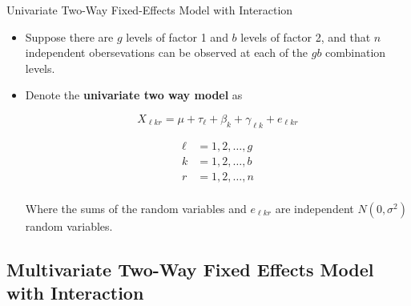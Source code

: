 \documentclass[8pt]{beamer}
\begin{document}
    \begin{frame}{Univariate Two-Way Fixed-Effects Model with Interaction} 
    
        \begin{itemize}
            \item Suppose there are $g$ levels of factor 1 and $b$ levels of factor 2, and that $n$ independent obersevations can be observed at each of the $gb$ combination levels.
            
            \item Denote the \textbf{univariate two way model} as
             
            \begin{equation}
                X_{\ell k r} = \mu + \tau_{\ell} + \beta_{k} + \gamma_{\ell k} + e_{\ell k r}
            \end{equation}
            
            \begin{align*}
                \ell &= 1,2,\hdots,g\\
                k &= 1,2,\hdots, b\\
                r &= 1,2,\hdots,n\\
            \end{align*}
            
            Where the sums of the random variables and $e_{\ell kr}$ are independent $N(0,\sigma^{2})$ random variables.
            
            
        \end{itemize}
        
    \end{frame}
    
\subsection{Multivariate Two-Way Fixed Effects Model with Interaction}
    
\end{document}
